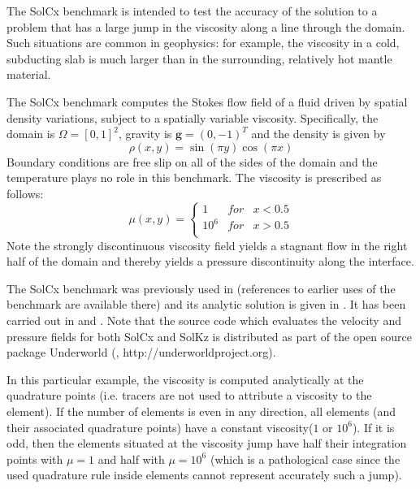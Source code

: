 
The SolCx benchmark is intended to test the accuracy of the solution to a problem that has a large jump in the viscosity along a line through the domain. Such situations are common in geophysics: for example, the viscosity in a cold, subducting slab is much larger than in the surrounding, relatively hot mantle material.

The SolCx benchmark computes the Stokes flow field of a fluid driven by spatial density variations, subject to a spatially variable viscosity. Specifically, the domain is $\Omega = [0,1]^2$, gravity is ${\bm g} = (0,-1)^T$ and the density is given by 
\begin{equation}
\rho(x,y) = \sin(\pi y) \cos(\pi x)
\end{equation}
Boundary conditions are free slip on all of the sides of the domain and the temperature plays no role in this benchmark. 
The viscosity is prescribed as follows:
\begin{equation}
\mu(x,y) = 
\left\{
\begin{array}{lll}
1 & for & x<0.5 \\
10^6 & for & x>0.5 \\
\end{array}
\right.
\end{equation}
Note the strongly discontinuous viscosity field yields a stagnant flow 
in the right half of the domain and thereby yields a pressure discontinuity along the interface. 

The SolCx benchmark was previously used in \cite{dumg11} (references to earlier uses of the benchmark are available there) and its analytic solution is given in \cite{zhon96}. It has been carried out in \cite{krhb12} and \cite{gemd13}. 
Note that the source code which evaluates the velocity and pressure fields for both SolCx and SolKz is 
distributed as part of the open source package Underworld (\cite{moql07}, http://underworldproject.org).

In this particular example, the viscosity is computed analytically at the quadrature points (i.e. tracers are 
not used to attribute a viscosity to the element). 
If the number of elements is even in any direction, all elements (and their associated quadrature points)
have a constant viscosity($1$ or  $10^6$). If it is odd, then the elements situated 
at the viscosity jump have half their integration points with $\mu=1$ and half with $\mu=10^6$ 
(which is a pathological case since the used quadrature rule inside elements cannot represent 
accurately such a jump).  

